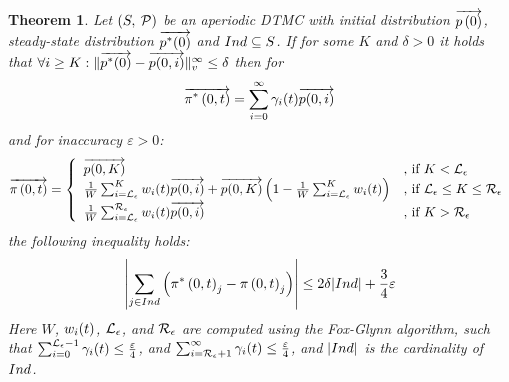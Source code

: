 \documentclass[a4paper,11pt]{article}
\newtheorem{theorem}{Theorem}
\begin{document}
		\begin{theorem}
			Let $\left( S,\: \mathcal{P} \right)$ be an aperiodic DTMC with initial distribution $\overrightarrow{p \left( 0 \right)}$, steady-state distribution $\overrightarrow{p^{*}(0)}$ and $Ind \subseteq S$. If for some $K$ and $\delta > 0$ it holds that $\forall i \geq K : \lVert  \overrightarrow{p^{*}(0)} - \overrightarrow{p(0,i)}  \rVert_{v}^{\infty} \leq \delta$ then for 
			\begin{equation}
				\overrightarrow{\pi^{*} \left(0, t \right )} = \sum_{i=0}^{\infty}\gamma_{i}(t) \overrightarrow{p(0,i)} \nonumber
			\end{equation}
			and for inaccuracy $\varepsilon > 0$:
			\begin{equation}
				\displaystyle
				\overrightarrow{\pi \left(0, t \right )} = \left\{
				\begin{array}{ll}
					\overrightarrow{p(0,K)} & \text{, if } K < \mathcal{L}_{\epsilon}\\
					\frac{1}{W} \sum_{i=\mathcal{L}_{\epsilon}}^{K}w_{i}(t) \overrightarrow{p(0,i)} + \overrightarrow{p(0,K)} \left(1- \frac{1}{W} \sum_{i=\mathcal{L}_{\epsilon}}^{K}w_{i}(t) \right) & \text{, if } \mathcal{L}_{\epsilon} \leq K \leq \mathcal{R}_{\epsilon}\\
					\frac{1}{W} \sum_{i=\mathcal{L}_{\epsilon}}^{\mathcal{R}_{\epsilon}}w_{i}(t) \overrightarrow{p(0,i)} & \text{, if } K > \mathcal{R}_{\epsilon}\\
				\end{array}
				\right .
				\nonumber
			\end{equation}
			the following inequality holds:
			\begin{equation}
				\left| \sum_{j \in Ind} \left( \pi^{*} \left(0, t \right )_{j} - \pi \left(0, t \right )_{j} \right) \right| \leq 2 \delta |Ind| + \frac{3}{4} \varepsilon \nonumber
			\end{equation}
			Here $W$, $w_{i}(t)$, $\mathcal{L}_{\epsilon}$, and $\mathcal{R}_{\epsilon}$ are computed using the Fox-Glynn algorithm, such that $\sum_{i=0}^{\mathcal{L}_{\epsilon}-1} \gamma_{i}(t) \leq \frac{\varepsilon}{4}$, and $\sum_{i=\mathcal{R}_{\epsilon}+1}^{\infty} \gamma_{i}(t) \leq \frac{\varepsilon}{4}$, and $| Ind |$ is the cardinality of $Ind$.
			\label{th:error_fwd}
		\end{theorem}
\end{document}
